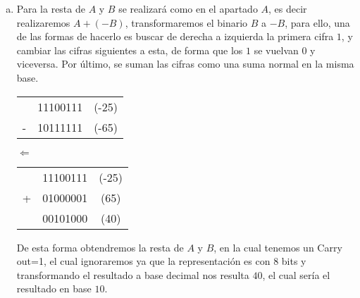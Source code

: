 \begin{frame}
	\begin{solution}
		\begin{enumerate}[b)]
			\item

			      Para la resta de $A$ y $B$ se realizará como en el
			      apartado $A$, es decir realizaremos $A+\left(-B\right)$,
			      transformaremos el binario $B$ a $-B$, para ello, una de
			      las formas de hacerlo es buscar de derecha a izquierda la
			      primera cifra $1$, y cambiar las cifras siguientes a
			      esta, de forma que los $1$ se vuelvan $0$ y viceversa.
			      Por último, se suman las cifras como una suma normal en
			      la misma base.

			      \begin{table}[ht!]
				      \begin{tabular}{c c c}
					        & 11100111 & (-25) \\
					      - & 10111111 & (-65) \\
					      \hline
				      \end{tabular}
				      \qquad
				      \begin{math}
					      \Longleftarrow
				      \end{math}
				      \qquad
				      \begin{tabular}{c c c}
					        & 11100111 & (-25) \\
					      + & 01000001 & (65)  \\
					      \hline
					        & 00101000 & (40)  \\
				      \end{tabular}
			      \end{table}
			      De esta forma obtendremos la resta de $A$ y $B$, en la
			      cual tenemos un Carry out=1, el cual ignoraremos ya que
			      la representación es con $8$ bits y transformando el
			      resultado a base decimal nos resulta $40$, el cual sería
			      el resultado en base $10$.
		\end{enumerate}
	\end{solution}
\end{frame}